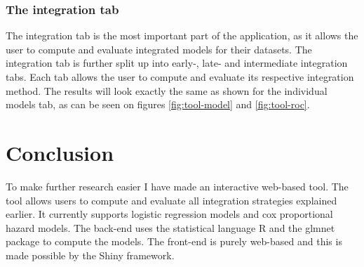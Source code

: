 \subsubsection{The integration tab}
The integration tab is the most important part of the application, as it allows the user to compute and evaluate integrated models for their datasets. The integration tab is further split up into early-, late- and intermediate integration tabs. Each tab allows the user to compute and evaluate its respective integration method. The results will look exactly the same as shown for the individual models tab, as can be seen on figures \ref{fig:tool-model} and \ref{fig:tool-roc}.

\section{Conclusion}
\label{sec:tool-conclusion}
To make further research easier I have made an interactive web-based tool. The tool allows users to compute and evaluate all integration strategies explained earlier. It currently supports logistic regression models and cox proportional hazard models. The back-end uses the statistical language R and the glmnet package to compute the models. The front-end is purely web-based and this is made possible by the Shiny framework.

